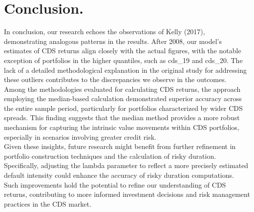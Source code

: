 \documentclass{article}
\begin{document}
\section{Conclusion.}

In conclusion, our research echoes the observations of Kelly (2017), demonstrating analogous patterns in the results. After 2008, our model's estimates of CDS returns align closely with the actual figures, with the notable exception of portfolios in the higher quantiles, such as cds\_{19} and cds\_{20}. The lack of a detailed methodological explanation in the original study for addressing these outliers contributes to the discrepancies we observe in the outcomes.\\

Among the methodologies evaluated for calculating CDS returns, the approach employing the median-based calculation demonstrated superior accuracy across the entire sample period, particularly for portfolios characterized by wider CDS spreads. This finding suggests that the median method provides a more robust mechanism for capturing the intrinsic value movements within CDS portfolios, especially in scenarios involving greater credit risk. \\

Given these insights, future research might benefit from further refinement in portfolio construction techniques and the calculation of risky duration. Specifically, adjusting the lambda parameter to reflect a more precisely estimated default intensity could enhance the accuracy of risky duration computations. Such improvements hold the potential to refine our understanding of CDS returns, contributing to more informed investment decisions and risk management practices in the CDS market.\\



\end{document}
